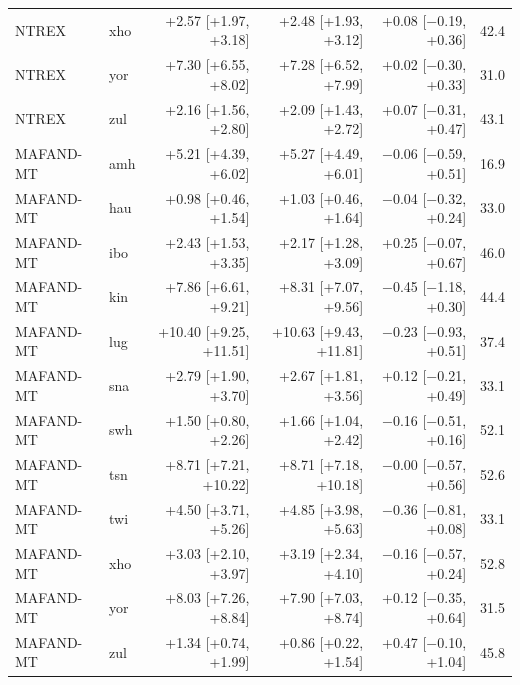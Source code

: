 {\begin{longtable}{@{}llrrrr@{}}
NTREX & xho & +2.57 [+1.97, +3.18] & +2.48 [+1.93, +3.12] & +0.08 [$-$0.19, +0.36] & 42.4 \\
NTREX & yor & +7.30 [+6.55, +8.02] & +7.28 [+6.52, +7.99] & +0.02 [$-$0.30, +0.33] & 31.0 \\
NTREX & zul & +2.16 [+1.56, +2.80] & +2.09 [+1.43, +2.72] & +0.07 [$-$0.31, +0.47] & 43.1 \\
MAFAND-MT & amh & +5.21 [+4.39, +6.02] & +5.27 [+4.49, +6.01] & $-$0.06 [$-$0.59, +0.51] & 16.9 \\
MAFAND-MT & hau & +0.98 [+0.46, +1.54] & +1.03 [+0.46, +1.64] & $-$0.04 [$-$0.32, +0.24] & 33.0 \\
MAFAND-MT & ibo & +2.43 [+1.53, +3.35] & +2.17 [+1.28, +3.09] & +0.25 [$-$0.07, +0.67] & 46.0 \\
MAFAND-MT & kin & +7.86 [+6.61, +9.21] & +8.31 [+7.07, +9.56] & $-$0.45 [$-$1.18, +0.30] & 44.4 \\
MAFAND-MT & lug & +10.40 [+9.25, +11.51] & +10.63 [+9.43, +11.81] & $-$0.23 [$-$0.93, +0.51] & 37.4 \\
MAFAND-MT & sna & +2.79 [+1.90, +3.70] & +2.67 [+1.81, +3.56] & +0.12 [$-$0.21, +0.49] & 33.1 \\
MAFAND-MT & swh & +1.50 [+0.80, +2.26] & +1.66 [+1.04, +2.42] & $-$0.16 [$-$0.51, +0.16] & 52.1 \\
MAFAND-MT & tsn & +8.71 [+7.21, +10.22] & +8.71 [+7.18, +10.18] & $-$0.00 [$-$0.57, +0.56] & 52.6 \\
MAFAND-MT & twi & +4.50 [+3.71, +5.26] & +4.85 [+3.98, +5.63] & $-$0.36 [$-$0.81, +0.08] & 33.1 \\
MAFAND-MT & xho & +3.03 [+2.10, +3.97] & +3.19 [+2.34, +4.10] & $-$0.16 [$-$0.57, +0.24] & 52.8 \\
MAFAND-MT & yor & +8.03 [+7.26, +8.84] & +7.90 [+7.03, +8.74] & +0.12 [$-$0.35, +0.64] & 31.5 \\
MAFAND-MT & zul & +1.34 [+0.74, +1.99] & +0.86 [+0.22, +1.54] & +0.47 [$-$0.10, +1.04] & 45.8 \\
\end{longtable}}

